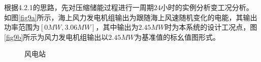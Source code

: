 \documentclass[journal,onecolumn]{IEEEtran}
\begin{document}
根据4.2.1的思路，先对压缩储能过程进行一周期$ 24 $小时的实例分析变工况分析。如图\ref{fig9a}所示，海上风力发电机组输出为跟随海上风速随机变化的电能，其输出功率范围为$ [0MW,3.06MW] $，其中输出为$ 2.45MW $时为本系统的设计工况点，图\ref{fig9b}所示为风力发电机组输出以$ 2.45MW $为基准值的标幺值图形式。\\
\begin{figure}[ht]
	\caption{风电站} %
	\label{fig:9}  %
\end{figure}
\end{document}
